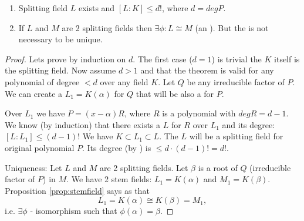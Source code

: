 \begin{theorem}
  \begin{enumerate}
    \item Splitting field $L$ exists and $\left[L:K\right] \le d!$,
      where $d = deg P$.
    \item If $L$ and $M$ are 2 splitting fields then
      $\exists \phi: L \cong M$ (an ). But
      the  is not necessary to be unique.
  \end{enumerate}
  \label{thm:lec2_1}
  \begin{proof}
    Lets prove by induction on $d$. The first case ($d = 1$) is
    trivial the $K$ itself is the splitting field. Now assume $d > 1$
    and that the theorem is valid for any polynomial of degree $< d$
    over any field $K$. Let $Q$ be any irreducible factor of $P$. We
    can create a  $L_1 = K\left(\alpha\right)$
    for $Q$ that will be also a  for $P$.

    Over $L_1$ we have $P = (x - \alpha) R$, where $R$ is a polynomial
    with $deg R = d - 1$. We know (by induction) that
    there exists a  $L$ for $R$ over $L_1$
    and its degree:
    \(
    \left[L:L_1\right] \le (d-1)!
    \)
    We have $K \subset L_1 \subset L$. The $L$ will be a splitting
    field for original polynomial $P$. Its degree (by
    ) is $ \le d \cdot (d-1)! = d!$.

    Uniqueness: Let $L$ and $M$ are 2 splitting fields. Let $\beta$ is
    a root of $Q$ (irreducible factor of $P$) in $M$.
    We have 2 stem fields: $L_1 = K\left(\alpha\right)$ and
    $M_1 = K\left(\beta\right)$. Proposition \ref{prop:stemfield} says
    as that
    \[
    L_1 = K\left(\alpha\right) \cong
    K\left(\beta\right) = M_1, 
    \]
    i.e. $\exists \phi$ - isomorphism such that $\phi(\alpha) = \beta$. 


\end{proof}
\end{theorem}
